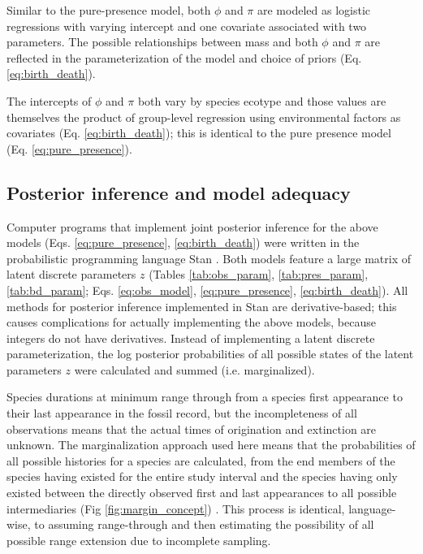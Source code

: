 Similar to the pure-presence model, both \(\phi\) and \(\pi\) are modeled as logistic regressions with varying intercept and one covariate associated with two parameters. The possible relationships between mass and both \(\phi\) and \(\pi\) are reflected in the parameterization of the model and choice of priors (Eq. \ref{eq:birth_death}).

The intercepts of \(\phi\) and \(\pi\) both vary by species ecotype and those values are themselves the product of group-level regression using environmental factors as covariates (Eq. \ref{eq:birth_death}); this is identical to the pure presence model (Eq. \ref{eq:pure_presence}).


\subsection*{Posterior inference and model adequacy}
Computer programs that implement joint posterior inference for the above models (Eqs. \ref{eq:pure_presence}, \ref{eq:birth_death}) were written in the probabilistic programming language Stan \citep{StanDevelopmentTeam2016}. Both models feature a large matrix of latent discrete parameters \(z\) (Tables \ref{tab:obs_param}, \ref{tab:pres_param}, \ref{tab:bd_param}; Eqs. \ref{eq:obs_model}, \ref{eq:pure_presence}, \ref{eq:birth_death}). All methods for posterior inference implemented in Stan are derivative-based; this causes complications for actually implementing the above models, because integers do not have derivatives. Instead of implementing a latent discrete parameterization, the log posterior probabilities of all possible states of the latent parameters \(z\) were calculated and summed (i.e. marginalized). 

Species durations at minimum range through from a species first appearance to their last appearance in the fossil record, but the incompleteness of all observations means that the actual times of origination and extinction are unknown. The marginalization approach used here means that the probabilities of all possible histories for a species are calculated, from the end members of the species having existed for the entire study interval and the species having only existed between the directly observed first and last appearances to all possible intermediaries (Fig \ref{fig:margin_concept}) \citep{StanDevelopmentTeam2016}. This process is identical, language-wise, to assuming range-through and then estimating the possibility of all possible range extension due to incomplete sampling. %


